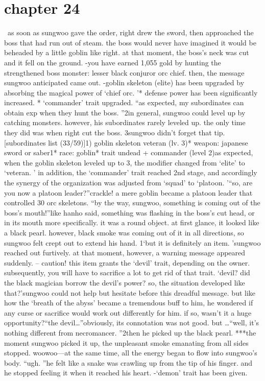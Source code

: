 \section{chapter 24}






 as soon as sungwoo gave the order, right drew the sword, then approached the boss that had run out of steam.
the boss would never have imagined it would be beheaded by a little goblin like right.
at that moment, the boss’s neck was cut and it fell on the ground.
-you have earned 1,055 gold by hunting the strengthened boss monster: lesser black conjuror orc chief.
then, the message sungwoo anticipated came out.
-goblin skeleton (elite) has been upgraded by absorbing the magical power of ‘chief orc.
’* defense power has been significantly increased.
* ‘commander’ trait upgraded.
“as expected, my subordinates can obtain exp when they hunt the boss.
”2in general, sungwoo could level up by catching monsters.
 however, his subordinates rarely leveled up.
 the only time they did was when right cut the boss.
3sungwoo didn’t forget that tip.
[subordinates list (33/59)]1) goblin skeleton veteran (lv.
 3)* weapon: japanese sword or saber1* race: goblin* trait undead + commander (level 2)as expected, when the goblin skeleton leveled up to 3, the modifier changed from ‘elite’ to ‘veteran.
’ in addition, the ‘commander’ trait reached 2nd stage, and accordingly the synergy of the organization was adjusted from ‘squad’ to ‘platoon.
’“so, are you now a platoon leader?”crackle!
a mere goblin became a platoon leader that controlled 30 orc skeletons.
“by the way, sungwoo, something is coming out of the boss’s mouth!”like hanho said, something was flashing in the boss’s cut head, or in its mouth more specifically.
it was a round object.
 at first glance, it looked like a black pearl.
 however, black smoke was coming out of it in all directions, so sungwoo felt crept out to extend his hand.
1‘but it is definitely an item.
’sungwoo reached out furtively.
 at that moment, however, a warning message appeared suddenly.
– caution! this item grants the ‘devil’ trait, depending on the owner.
 subsequently, you will have to sacrifice a lot to get rid of that trait.
‘devil? did the black magician borrow the devil’s power? so, the situation developed like that?’sungwoo could not help but hesitate before this dreadful message.
 but like how the ‘breath of the abyss’ became a tremendous buff to him, he wondered if any curse or sacrifice would work out differently for him.
 if so, wasn’t it a huge opportunity?“the devil…”obviously, its connotation was not good.
 but …“well, it’s nothing different from necromancer.
”2then he picked up the black pearl.
***the moment sungwoo picked it up, the unpleasant smoke emanating from all sides stopped.
woowoo—at the same time, all the energy began to flow into sungwoo’s body.
“ugh.
”he felt like a snake was crawling up from the tip of his finger.
 and he stopped feeling it when it reached his heart.
-‘demon’ trait has been given.

